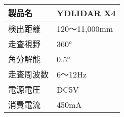 \begin{tabular}{|l|l|}
\hline
製品名   & YDLIDAR X4 \\ \hline
検出距離  & 120〜11,000mm \\ \hline
走査視野  & 360° \\ \hline
角分解能  & 0.5° \\ \hline
走査周波数 & 6〜12Hz \\ \hline
電源電圧  & DC5V \\ \hline
消費電流  & 450mA \\ \hline
\end{tabular}
